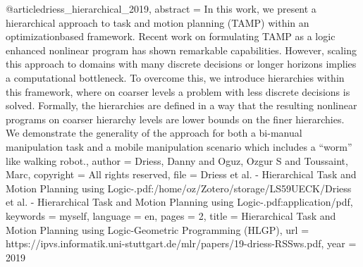 @article{driess_hierarchical_2019,
 abstract = {In this work, we present a hierarchical approach to task and motion planning (TAMP) within an optimizationbased framework. Recent work on formulating TAMP as a logic enhanced nonlinear program has shown remarkable capabilities. However, scaling this approach to domains with many discrete decisions or longer horizons implies a computational bottleneck. To overcome this, we introduce hierarchies within this framework, where on coarser levels a problem with less discrete decisions is solved. Formally, the hierarchies are deﬁned in a way that the resulting nonlinear programs on coarser hierarchy levels are lower bounds on the ﬁner hierarchies. We demonstrate the generality of the approach for both a bi-manual manipulation task and a mobile manipulation scenario which includes a “worm” like walking robot.},
 author = {Driess, Danny and Oguz, Ozgur S and Toussaint, Marc},
 copyright = {All rights reserved},
 file = {Driess et al. - Hierarchical Task and Motion Planning using Logic-.pdf:/home/oz/Zotero/storage/LS59UECK/Driess et al. - Hierarchical Task and Motion Planning using Logic-.pdf:application/pdf},
 keywords = {myself},
 language = {en},
 pages = {2},
 title = {Hierarchical Task and Motion Planning using Logic-Geometric Programming (HLGP)},
 url = {https://ipvs.informatik.uni-stuttgart.de/mlr/papers/19-driess-RSSws.pdf},
 year = {2019}
}

